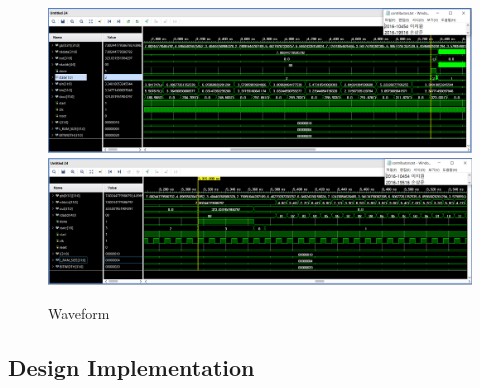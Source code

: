 \documentclass{article}
\begin{document}
\begin{figure}[ht]
	\centering
	\includegraphics[width=1.0\textwidth]{fig/My_PE_Controller_Waveform4.png}
	\includegraphics[width=1.0\textwidth]{fig/My_PE_Controller_Waveform5.png}
\caption{Waveform}
\label{fig3}
\end{figure}

\subsection{Design Implementation}
\end{document}
